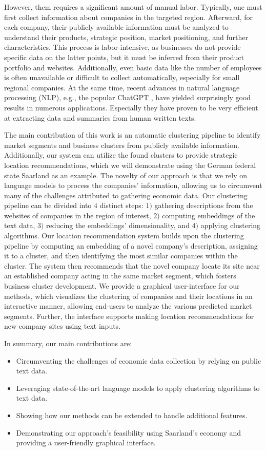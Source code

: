 \documentclass[12pt]{article}
\begin{document}
   However, them requires a significant amount of manual labor. Typically, one must first collect information about companies in the targeted region. Afterward, for each company, their publicly available information must be analyzed to understand their products, strategic position, market positioning, and further characteristics. 
   This process is labor-intensive, as businesses do not provide specific data on the latter points, but it must be inferred from their product portfolio and websites. Additionally, even basic data like the number of employees is often unavailable or difficult to collect automatically, especially for small regional companies.
   At the same time, recent advances in natural language processing (NLP), e.g., the popular ChatGPT \cite{chatgpt}, have yielded surprisingly good results in numerous applications. Especially they have proven to be very efficient at extracting data and summaries from human written texts.
   
   The main contribution of this work is an automatic clustering pipeline to identify market segments and business clusters from publicly available information. Additionally, our system can utilize the found clusters to provide strategic location recommendations, which we will demonstrate using the German federal state Saarland as an example. The novelty of our approach is that we rely on language models to process the companies' information, allowing us to circumvent many of the challenges attributed to gathering economic data. 
   Our clustering pipeline can be divided into $4$ distinct steps: $1)$ gathering descriptions from the websites of companies in the region of interest, $2)$ computing embeddings of the text data, $3)$ reducing the embeddings' dimensionality, and $4)$ applying clustering algorithms.
   Our location recommendation system builds upon the clustering pipeline by computing an embedding of a novel company's description, assigning it to a cluster, and then identifying the most similar companies within the cluster. The system then recommends that the novel company locate its site near an established company acting in the same market segment, which fosters business cluster development.
   We provide a graphical user-interface for our methods, which visualizes the clustering of companies and their locations in an interactive manner, allowing end-users to analyze the various predicted market segments. Further, the interface supports making location recommendations for new company sites using text inputs.
   
   In summary, our main contributions are:
   \begin{itemize}[noitemsep]
   	\item Circumventing the challenges of economic data collection by relying on public text data.
   	\item Leveraging state-of-the-art language models to apply clustering algorithms to text data.
   	\item Showing how our methods can be extended to handle additional features.
   	\item Demonstrating our approach's feasibility using Saarland's economy and providing a user-friendly graphical interface.
   \end{itemize}
   
\end{document}
